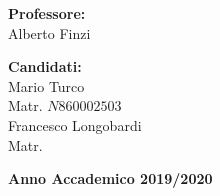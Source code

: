 \documentclass[a4paper,12pt,openright,oneside]{book}
\begin{document}
\begin{titlepage}
\vspace{25mm}
\par
\noindent
\begin{minipage}[t]{0.47\textwidth}
    \textbf{Professore:}\\
    Alberto Finzi\\    %
\end{minipage}
\hfill
\begin{minipage}[t]{0.47\textwidth}\raggedleft
    \textbf{Candidati:}\\
    Mario Turco\\ %
    Matr. $N860002503$\\
    Francesco Longobardi\\
    Matr. 
\end{minipage}
\vspace{5.5mm}
\begin{center}
    {\large{\bf Anno Accademico 2019/2020}} %
\end{center}
\end{titlepage}
\end{document}
